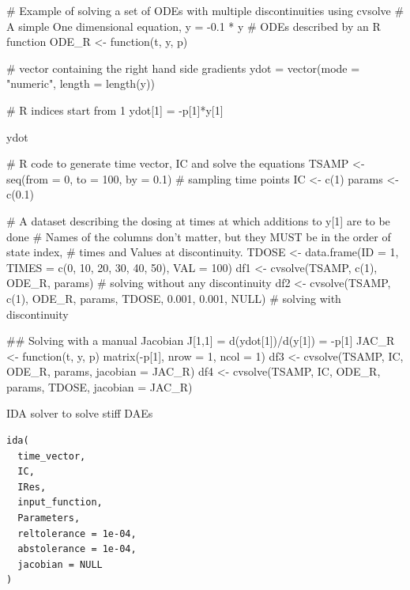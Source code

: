 \documentclass[letterpaper]{book}
\begin{document}
\begin{Examples}
\begin{ExampleCode}
# Example of solving a set of ODEs with multiple discontinuities using cvsolve
# A simple One dimensional equation, y = -0.1 * y
# ODEs described by an R function
ODE_R <- function(t, y, p){

  # vector containing the right hand side gradients
  ydot = vector(mode = "numeric", length = length(y))

  # R indices start from 1
  ydot[1] = -p[1]*y[1]

  ydot

}

# R code to generate time vector, IC and solve the equations
TSAMP <- seq(from = 0, to = 100, by = 0.1)      # sampling time points
IC <- c(1)
params <- c(0.1)

# A dataset describing the dosing at times at which additions to y[1] are to be done
# Names of the columns don't matter, but they MUST be in the order of state index,
# times and Values at discontinuity.
TDOSE <- data.frame(ID = 1, TIMES = c(0, 10, 20, 30, 40, 50), VAL = 100)
df1 <- cvsolve(TSAMP, c(1), ODE_R, params)         # solving without any discontinuity
df2 <- cvsolve(TSAMP, c(1), ODE_R, params, TDOSE, 0.001, 0.001, NULL)  # solving with discontinuity

## Solving with a manual Jacobian  J[1,1] = d(ydot[1])/d(y[1]) = -p[1]
JAC_R <- function(t, y, p) matrix(-p[1], nrow = 1, ncol = 1)
df3 <- cvsolve(TSAMP, IC, ODE_R, params, jacobian = JAC_R)
df4 <- cvsolve(TSAMP, IC, ODE_R, params, TDOSE, jacobian = JAC_R)
\end{ExampleCode}
\end{Examples}
%
\begin{Description}
IDA solver to solve stiff DAEs
\end{Description}
%
\begin{Usage}
\begin{verbatim}
ida(
  time_vector,
  IC,
  IRes,
  input_function,
  Parameters,
  reltolerance = 1e-04,
  abstolerance = 1e-04,
  jacobian = NULL
)
\end{verbatim}
\end{Usage}
%
\end{document}
